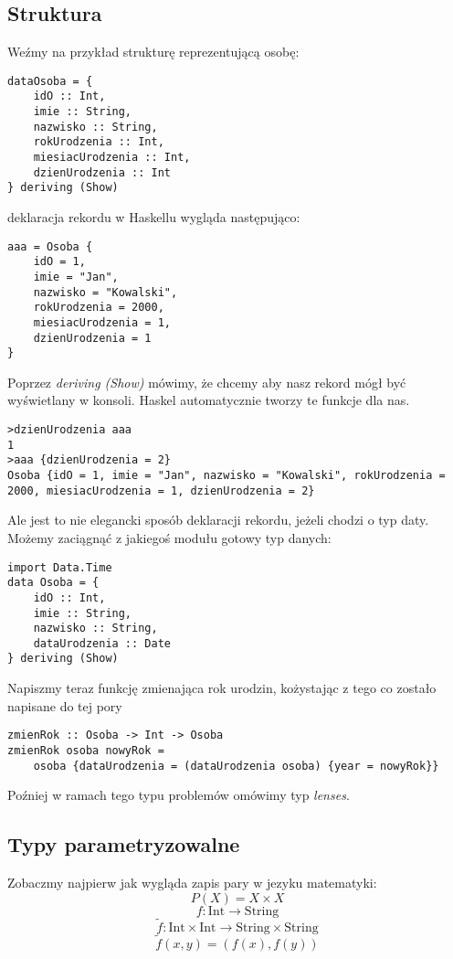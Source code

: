 \documentclass[11pt,a4paper]{article}
\begin{document}
\subsection{Struktura}
Weźmy na przykład strukturę reprezentującą osobę:
\begin{Verbatim}[frame=single]
dataOsoba = {
    idO :: Int,
    imie :: String,
    nazwisko :: String,
    rokUrodzenia :: Int,
    miesiacUrodzenia :: Int,
    dzienUrodzenia :: Int
} deriving (Show)
\end{Verbatim}
deklaracja rekordu w Haskellu wygląda następująco:
\begin{Verbatim}[frame=single]
aaa = Osoba {
    idO = 1,
    imie = "Jan",
    nazwisko = "Kowalski",
    rokUrodzenia = 2000,
    miesiacUrodzenia = 1,
    dzienUrodzenia = 1
}
\end{Verbatim}
Poprzez \textit{deriving (Show)} mówimy, że chcemy aby nasz rekord mógł być wyświetlany w konsoli. Haskel automatycznie tworzy te funkcje dla nas.
\begin{Verbatim}[frame=single]
>dzienUrodzenia aaa
1
>aaa {dzienUrodzenia = 2}
Osoba {idO = 1, imie = "Jan", nazwisko = "Kowalski", rokUrodzenia = 2000, miesiacUrodzenia = 1, dzienUrodzenia = 2}
\end{Verbatim}

Ale jest to nie elegancki sposób deklaracji rekordu, jeżeli chodzi o typ daty. Możemy zaciągnąć z jakiegoś modułu gotowy typ danych:
\begin{Verbatim}[frame=single]
import Data.Time
data Osoba = {
    idO :: Int,
    imie :: String,
    nazwisko :: String,
    dataUrodzenia :: Date
} deriving (Show)
\end{Verbatim}
Napiszmy teraz funkcję zmienająca rok urodzin, kożystając z tego co zostało napisane do tej pory
\begin{Verbatim}[frame=single]
zmienRok :: Osoba -> Int -> Osoba
zmienRok osoba nowyRok =
    osoba {dataUrodzenia = (dataUrodzenia osoba) {year = nowyRok}}
\end{Verbatim}

Poźniej w ramach tego typu problemów omówimy typ \textit{lenses}.
\subsection{Typy parametryzowalne}
Zobaczmy najpierw jak wygląda zapis pary w jezyku matematyki:
\[
    P(X) = X \times X
\]
\[
    f: \text{Int} \rightarrow \text{String}
\]
\[
    \tilde{f}: \text{Int} \times \text{Int} \rightarrow \text{String} \times \text{String}
\]
\[
    \tilde{f}(x,y) = (f(x),f(y))
\]
\end{document}
